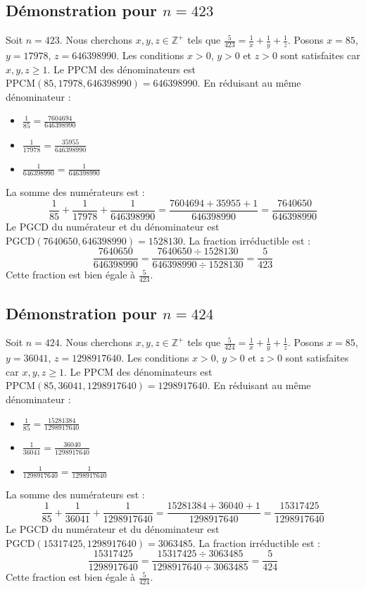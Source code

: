 \documentclass[11pt,a4paper]{article}
\begin{document}
\subsection{Démonstration pour $n = 423$}
Soit $n = 423$. Nous cherchons $x, y, z \in \mathbb{Z}^{+}$ tels que $\frac{5}{423} = \frac{1}{x} + \frac{1}{y} + \frac{1}{z}$.
Posons $x = 85$, $y = 17978$, $z = 646398990$.
Les conditions $x > 0$, $y > 0$ et $z > 0$ sont satisfaites car $x, y, z \geq 1$.
Le PPCM des dénominateurs est $\text{PPCM}(85, 17978, 646398990) = 646398990$.
En réduisant au même dénominateur :
\begin{itemize}
    \item $\frac{1}{85} = \frac{7604694}{646398990}$
    \item $\frac{1}{17978} = \frac{35955}{646398990}$
    \item $\frac{1}{646398990} = \frac{1}{646398990}$
\end{itemize}
La somme des numérateurs est :
$$ \frac{1}{85} + \frac{1}{17978} + \frac{1}{646398990} = \frac{7604694 + 35955 + 1}{646398990} = \frac{7640650}{646398990} $$
Le PGCD du numérateur et du dénominateur est $\text{PGCD}(7640650, 646398990) = 1528130$.
La fraction irréductible est :
$$ \frac{7640650}{646398990} = \frac{7640650 \div 1528130}{646398990 \div 1528130} = \frac{5}{423} $$
Cette fraction est bien égale à $\frac{5}{423}$.

\subsection{Démonstration pour $n = 424$}
Soit $n = 424$. Nous cherchons $x, y, z \in \mathbb{Z}^{+}$ tels que $\frac{5}{424} = \frac{1}{x} + \frac{1}{y} + \frac{1}{z}$.
Posons $x = 85$, $y = 36041$, $z = 1298917640$.
Les conditions $x > 0$, $y > 0$ et $z > 0$ sont satisfaites car $x, y, z \geq 1$.
Le PPCM des dénominateurs est $\text{PPCM}(85, 36041, 1298917640) = 1298917640$.
En réduisant au même dénominateur :
\begin{itemize}
    \item $\frac{1}{85} = \frac{15281384}{1298917640}$
    \item $\frac{1}{36041} = \frac{36040}{1298917640}$
    \item $\frac{1}{1298917640} = \frac{1}{1298917640}$
\end{itemize}
La somme des numérateurs est :
$$ \frac{1}{85} + \frac{1}{36041} + \frac{1}{1298917640} = \frac{15281384 + 36040 + 1}{1298917640} = \frac{15317425}{1298917640} $$
Le PGCD du numérateur et du dénominateur est $\text{PGCD}(15317425, 1298917640) = 3063485$.
La fraction irréductible est :
$$ \frac{15317425}{1298917640} = \frac{15317425 \div 3063485}{1298917640 \div 3063485} = \frac{5}{424} $$
Cette fraction est bien égale à $\frac{5}{424}$.
\end{document}
